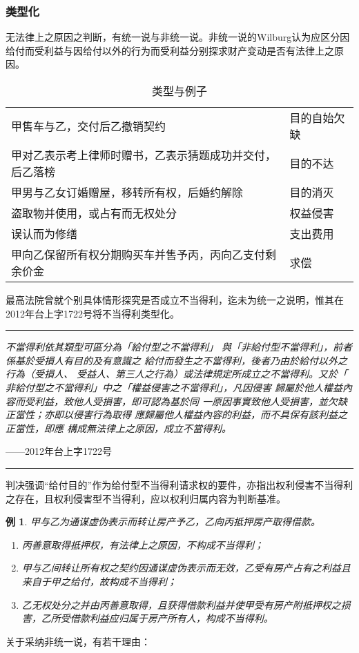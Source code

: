 \documentclass[UTF-8]{ctexrep}
\newcommand{\cas}[2]{#1年台上字#2号}
\newcommand{\prov}[2]{\par\noindent\rule{\textwidth}{1pt}\par {\itshape #1}\par\mbox{}\hfill——#2\par\noindent\rule{\textwidth}{1pt}}
\newtheorem{ex}{例}
\newcommand{\pA}{{甲}}
\newcommand{\pB}{{乙}}
\newcommand{\pC}{{丙}}
\begin{document}
  \subsubsection{类型化}
  无法律上之原因之判断，有统一说与非统一说。非统一说的Wilburg认为应区分因给付而受利益与因给付以外的行为而受利益分别探求财产变动是否有法律上之原因。
  \begin{table}[!h]
    \centering
    \begin{tabular}{>{\centering}m{6cm} >{\centering\arraybackslash}m{3cm}}
      \hline
      甲售车与乙，交付后乙撤销契约 & 目的自始欠缺 \\
      甲对乙表示考上律师时赠书，乙表示猜题成功并交付，后乙落榜 & 目的不达 \\
      甲男与乙女订婚赠屋，移转所有权，后婚约解除 & 目的消灭 \\
      \hline
      盗取物并使用，或占有而无权处分 & 权益侵害 \\
      误认而为修缮 & 支出费用 \\
      甲向乙保留所有权分期购买车并售予丙，丙向乙支付剩余价金 & 求偿 \\
      \hline
    \end{tabular}
    \caption{类型与例子}
    \label{table:types}
  \end{table}
  \par
  最高法院曾就个别具体情形探究是否成立不当得利，迄未为统一之说明，惟其在\cas{2012}{1722}将不当得利类型化。
  \prov{不當得利依其類型可區分為「給付型之不當得利」
與「非給付型不當得利」，前者係基於受損人有目的及有意識之
給付而發生之不當得利，後者乃由於給付以外之行為（受損人、
受益人、第三人之行為）或法律規定所成立之不當得利。又於「
非給付型之不當得利」中之「權益侵害之不當得利」，凡因侵害
歸屬於他人權益內容而受利益，致他人受損害，即可認為基於同
一原因事實致他人受損害，並欠缺正當性；亦即以侵害行為取得
應歸屬他人權益內容的利益，而不具保有該利益之正當性，即應
構成無法律上之原因，成立不當得利。}{\cas{2012}{1722}}
  \par
  判决强调“给付目的”作为给付型不当得利请求权的要件，亦指出权利侵害不当得利之存在，且权利侵害型不当得利，应以权利归属内容为判断基准。
  \begin{ex}
    \pA 与\pB 为通谋虚伪表示而转让房产予\pB ，\pB 向\pC 抵押房产取得借款。
    \begin{enumerate}
    \item \pC 善意取得抵押权，有法律上之原因，不构成不当得利；
    \item \pA 与\pB 间转让所有权之契约因通谋虚伪表示而无效，\pB 受有房产占有之利益且来自于\pA 之给付，故构成不当得利；
    \item \pB 无权处分之并由\pC 善意取得，且获得借款利益并使\pA 受有房产附抵押权之损害，\pB 所受借款利益应归属于房产所有人，构成不当得利。
    \end{enumerate}
  \end{ex}
  \par
  关于采纳非统一说，有若干理由：
\end{document}
